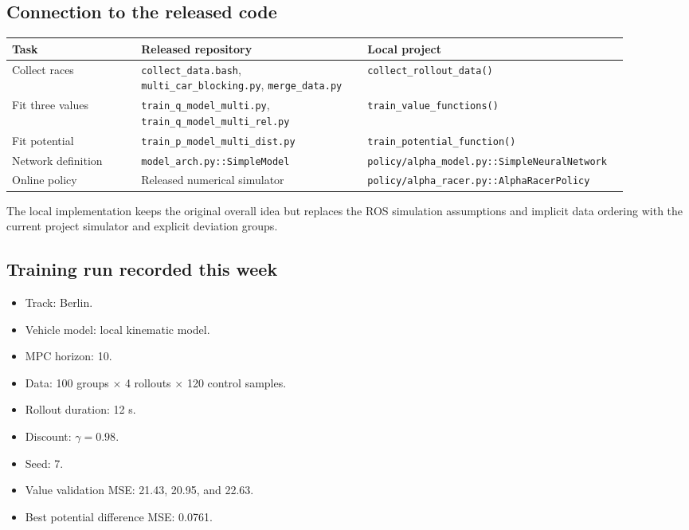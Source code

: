 \documentclass[11pt]{article}
\newcommand{\code}[1]{\texttt{#1}}
\begin{document}
\subsection{Connection to the released code}

\begin{center}
\small
\begin{tabular}{p{0.20\linewidth}p{0.35\linewidth}p{0.35\linewidth}}
\toprule
Task & Released repository & Local project \\
\midrule
Collect races &
\code{collect\_data.bash}, \code{multi\_car\_blocking.py},
\code{merge\_data.py} &
\code{collect\_rollout\_data()} \\
Fit three values &
\code{train\_q\_model\_multi.py},
\code{train\_q\_model\_multi\_rel.py} &
\code{train\_value\_functions()} \\
Fit potential &
\code{train\_p\_model\_multi\_dist.py} &
\code{train\_potential\_function()} \\
Network definition &
\code{model\_arch.py::SimpleModel} &
\code{policy/alpha\_model.py::SimpleNeuralNetwork} \\
Online policy &
Released numerical simulator &
\code{policy/alpha\_racer.py::AlphaRacerPolicy} \\
\bottomrule
\end{tabular}
\end{center}

The local implementation keeps the original overall idea but replaces the ROS
simulation assumptions and implicit data ordering with the current project
simulator and explicit deviation groups.

\subsection{Training run recorded this week}

\begin{itemize}
  \item Track: Berlin.
  \item Vehicle model: local kinematic model.
  \item MPC horizon: 10.
  \item Data: 100 groups $\times$ 4 rollouts $\times$ 120 control samples.
  \item Rollout duration: 12 s.
  \item Discount: $\gamma=0.98$.
  \item Seed: 7.
  \item Value validation MSE: 21.43, 20.95, and 22.63.
  \item Best potential difference MSE: 0.0761.
\end{itemize}
\end{document}
